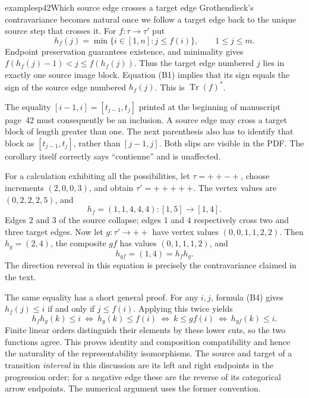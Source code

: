 \begin{dcomment}{examples}{p42}{Which source edge crosses a target edge}
Grothendieck's contravariance becomes natural once we follow a target edge back to the unique source step that crosses it. For $f:\tau\to\tau'$ put
\[
 h_f(j)=\min\{i\in[1,n]:j\leq f(i)\},\qquad 1\leq j\leq m.
                                                               \tag{B4}
\]
Endpoint preservation guarantees existence, and minimality gives
$f(h_f(j)-1)<j\leq f(h_f(j))$. Thus the target edge numbered $j$ lies in exactly one source image block. Equation (B1) implies that its sign equals the sign of the source edge numbered $h_f(j)$. This is $\operatorname{Tr}(f)^*$.

The equality $[i-1,i]=[t_{j-1},t_j]$ printed at the beginning of manuscript page~42 must consequently be an inclusion. A source edge may cross a target block of length greater than one. The next parenthesis also has to identify that block as $[t_{j-1},t_j]$, rather than $[j-1,j]$. Both slips are visible in the PDF. The corollary itself correctly says ``contienne'' and is unaffected.

For a calculation exhibiting all the possibilities, let $\tau=++-+$, choose increments $(2,0,0,3)$, and obtain $\tau'=+++++$. The vertex values are $(0,2,2,2,5)$, and
\[
 h_f=(1,1,4,4,4):[1,5]\longrightarrow[1,4].
\]
Edges $2$ and $3$ of the source collapse; edges $1$ and $4$ respectively cross two and three target edges. Now let $g:\tau'\to++$ have vertex values $(0,0,1,1,2,2)$. Then $h_g=(2,4)$, the composite $gf$ has values $(0,1,1,1,2)$, and
\[
 h_{gf}=(1,4)=h_fh_g.
\]
The direction reversal in this equation is precisely the contravariance claimed in the text.

The same equality has a short general proof. For any $i,j$, formula (B4) gives
$h_f(j)\leq i$ if and only if $j\leq f(i)$. Applying this twice yields
\[
 h_fh_g(k)\leq i
 \ \Longleftrightarrow\ h_g(k)\leq f(i)
 \ \Longleftrightarrow\ k\leq gf(i)
 \ \Longleftrightarrow\ h_{gf}(k)\leq i.
\]
Finite linear orders distinguish their elements by these lower cuts, so the two functions agree. This proves identity and composition compatibility and hence the naturality of the representability isomorphisms. The source and target of a transition \emph{interval} in this discussion are its left and right endpoints in the progression order; for a negative edge these are the reverse of its categorical arrow endpoints. The numerical argument uses the former convention.
\end{dcomment}

